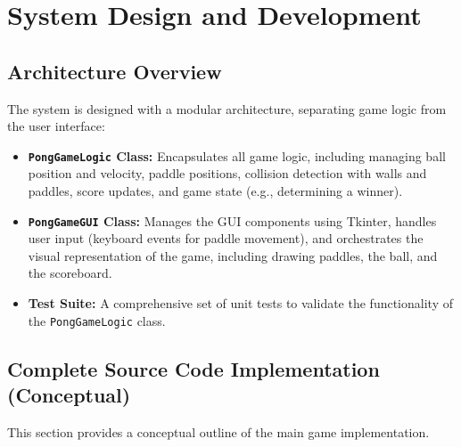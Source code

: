 \documentclass[12pt,a4paper]{article}
\begin{document}
\section{System Design and Development}
\subsection{Architecture Overview}
The system is designed with a modular architecture, separating game logic from the user interface:
\begin{itemize}
    \item \textbf{\texttt{PongGameLogic} Class:} Encapsulates all game logic, including managing ball position and velocity, paddle positions, collision detection with walls and paddles, score updates, and game state (e.g., determining a winner).
    \item \textbf{\texttt{PongGameGUI} Class:} Manages the GUI components using Tkinter, handles user input (keyboard events for paddle movement), and orchestrates the visual representation of the game, including drawing paddles, the ball, and the scoreboard.
    \item \textbf{Test Suite:} A comprehensive set of unit tests to validate the functionality of the \texttt{PongGameLogic} class.
\end{itemize}

\subsection{Complete Source Code Implementation (Conceptual)}
This section provides a conceptual outline of the main game implementation.
\end{document}
